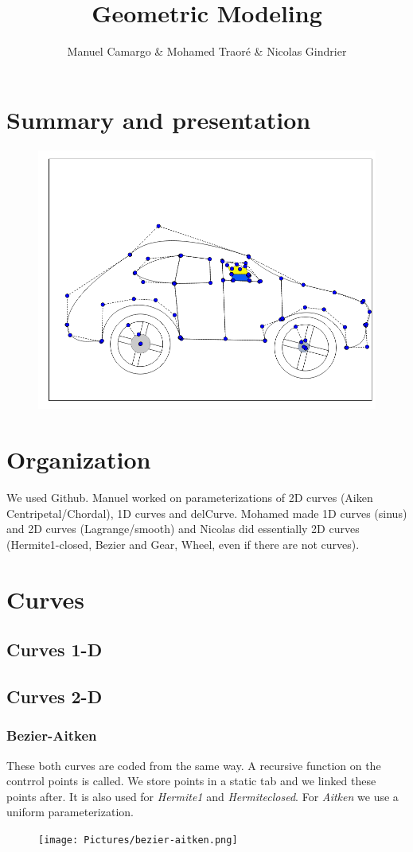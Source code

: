 \documentclass{article}
\title{Geometric Modeling}
\author{Manuel Camargo & Mohamed Traoré &  Nicolas Gindrier}
\date{}
\begin{document}
\maketitle
\section*{Summary and presentation}
\begin{figure}[H]
   \includegraphics[scale = 0.5]{Pictures/narutovoiture.png}
\end{figure}
\section*{Organization}
We used Github. Manuel worked on parameterizations of 2D curves (Aiken Centripetal/Chordal), 1D curves and delCurve. Mohamed made 1D curves (sinus) and 2D curves (Lagrange/smooth) and Nicolas did essentially 2D curves (Hermite1-closed, Bezier and Gear, Wheel, even if there are not curves). 
\section*{Curves}
\subsection*{Curves 1-D}
\subsection*{Curves 2-D}
\subsubsection*{Bezier-Aitken}
These both curves are coded from the same way. A recursive function on the contrrol points is called. We store points in a static tab and we linked these points after. It is also used for \textit{Hermite1} and \textit{Hermiteclosed}. For \textit{Aitken} we use a uniform parameterization. 
\begin{figure}[H]
   \texttt{[image: Pictures/bezier-aitken.png]}
\end{figure}
\end{document}
